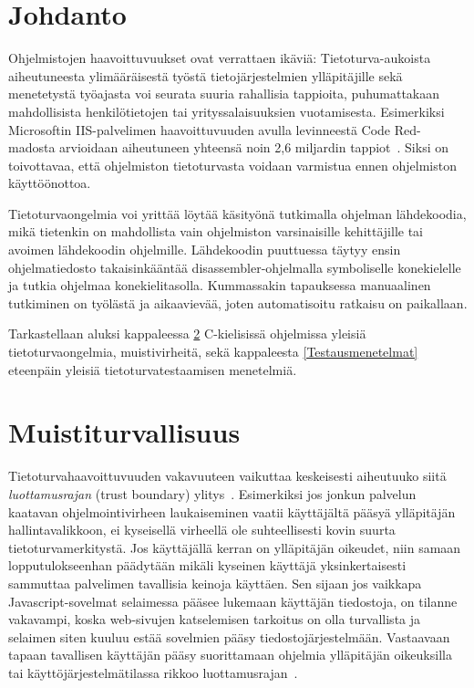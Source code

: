 \section{Johdanto}

Ohjelmistojen haavoittuvuukset ovat verrattaen ikäviä:
Tietoturva-aukoista aiheutuneesta ylimääräisestä työstä tietojärjestelmien ylläpitäjille
sekä menetetystä työajasta voi seurata suuria rahallisia tappioita,
puhumattakaan mahdollisista henkilötietojen tai yrityssalaisuuksien vuotamisesta.
Esimerkiksi Microsoftin IIS-palvelimen haavoittuvuuden avulla levinneestä Code Red-madosta
arvioidaan aiheutuneen yhteensä noin 2,6 miljardin tappiot~\cite{CodeRed}.
Siksi on toivottavaa, että ohjelmiston tietoturvasta voidaan varmistua ennen ohjelmiston käyttöönottoa.

Tietoturvaongelmia voi yrittää löytää käsityönä tutkimalla ohjelman lähdekoodia,
mikä tietenkin on mahdollista vain ohjelmiston varsinaisille kehittäjille
tai avoimen lähdekoodin ohjelmille.
Lähdekoodin puuttuessa täytyy ensin ohjelmatiedosto takaisinkääntää
disassembler-ohjelmalla symboliselle konekielelle
ja tutkia ohjelmaa konekielitasolla.
Kummassakin tapauksessa manuaalinen tutkiminen on työlästä ja aikaavievää, joten automatisoitu ratkaisu on paikallaan.

Tarkastellaan aluksi kappaleessa \ref{YleinenTietoturva} C-kielisissä ohjelmissa yleisiä tietoturvaongelmia,
muistivirheitä, sekä kappaleesta \ref{Testausmenetelmat} eteenpäin yleisiä tietoturvatestaamisen menetelmiä.

\section{Muistiturvallisuus}
\label{YleinenTietoturva}

Tietoturvahaavoittuvuuden vakavuuteen vaikuttaa keskeisesti aiheutuuko siitä \emph{luottamusrajan}
(trust boundary) ylitys~\cite{ViolatingAssumptions}.
Esimerkiksi jos jonkun palvelun kaatavan ohjelmointivirheen laukaiseminen vaatii käyttäjältä pääsyä
ylläpitäjän hallintavalikkoon, ei kyseisellä virheellä ole suhteellisesti kovin suurta tietoturvamerkitystä.
Jos käyttäjällä kerran on ylläpitäjän oikeudet, niin samaan lopputulokseenhan päädytään mikäli kyseinen
käyttäjä yksinkertaisesti sammuttaa palvelimen tavallisia keinoja käyttäen.
Sen sijaan jos vaikkapa Javascript-sovelmat selaimessa pääsee lukemaan käyttäjän tiedostoja,
on tilanne vakavampi,
koska web-sivujen katselemisen tarkoitus on olla turvallista ja selaimen siten
kuuluu estää sovelmien pääsy tiedostojärjestelmään.
Vastaavaan tapaan tavallisen käyttäjän pääsy suorittamaan ohjelmia ylläpitäjän oikeuksilla
tai käyttöjärjestelmätilassa rikkoo luottamusrajan~\cite{ViolatingAssumptions}.

